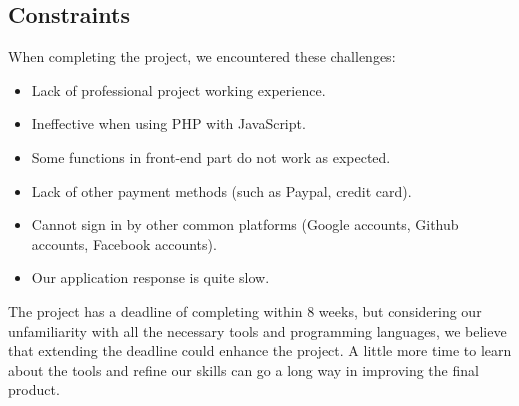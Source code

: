 \subsection{Constraints}
\noindent When completing the project, we encountered these challenges:
\begin{itemize}
    \item Lack of professional project working experience.
    \item Ineffective when using PHP with JavaScript.
    \item Some functions in front-end part do not work as expected.
    \item Lack of other payment methods (such as Paypal, credit card).
    \item Cannot sign in by other common platforms (Google accounts, Github accounts, Facebook accounts). 
    \item Our application response is quite slow.
\end{itemize}

\noindent The project has a deadline of completing within 8 weeks, but considering our unfamiliarity with all the necessary tools and programming languages, we believe that extending the deadline could enhance the project. A little more time to learn about the tools and refine our skills can go a long way in improving the final product. 